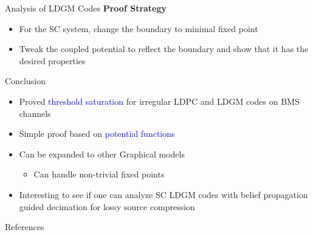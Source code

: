 \documentclass{beamer}
\newlength{\threecolwid}
\begin{document}
\begin{frame}
\begin{columns}[t]
\begin{column}{\threecolwid}
\begin{block}{Analysis of LDGM Codes}
      \vspace{1.25cm}
      \textcolor{jblue}{\bf Proof Strategy}
      \begin{itemize}
      \item\vspace{0.75cm} For the SC system, change the boundary to \alert{minimal fixed point}
      \item\vspace{0.75cm} Tweak the coupled potential to reflect the boundary and show that it has the \alert{desired} properties
      \end{itemize}
    \end{block}


    \vspace{2.5cm}
    \begin{alertblock}{Conclusion}
      \begin{itemize}
      \item Proved \textcolor{blue}{threshold saturation} for irregular LDPC and LDGM codes on BMS channels
      \item\vspace{0.75cm} Simple proof based on \textcolor{blue}{potential functions}
      \item\vspace{0.75cm} Can be expanded to other Graphical models
        \begin{itemize}
        \item\vspace{0.75cm} Can handle \alert{non-trivial fixed points}
        \end{itemize}
      \item\vspace{0.75cm} Interesting to see if one can analyze SC LDGM codes with belief propagation guided decimation for lossy source compression 
      \end{itemize}
    \end{alertblock}

    \vspace{2.5cm}
    \begin{block}{References}


\end{block}
\end{column}
\end{columns}
\end{frame}
\end{document}
